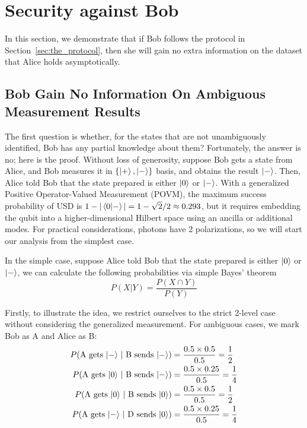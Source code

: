 \documentclass[%
 reprint,
superscriptaddress,
 amsmath,amssymb,
 aps,
]{revtex4-2}
\begin{document}
\section{Security against Bob}
\label{sec:Bob_Cheating}

In this section, we demonstrate that if Bob follows the protocol in Section~\ref{sec:the_protocol}, then she will gain no extra information on the dataset that Alice holds asymptotically.


\subsection{Bob Gain No Information On Ambiguous Measurement Results}
The first question is whether, for the states that are not unambiguously identified, Bob has any partial knowledge about them? Fortunately, the answer is no; here is the proof. Without loss of generosity, suppose Bob gets a state from Alice, and Bob measures it in $\{\ket{+}, \ket{-}\}$ basis, and obtains the result $\ket{-}$. Then, Alice told Bob that the state prepared is either $\ket{0}$ or $\ket{-}$. With a generalized Positive Operator-Valued Measurement (POVM), the maximum success probability of USD is $1-|\bra{0}\ket{-}|=1-\sqrt{2}/2\approx0.293$, but it requires embedding the qubit into a higher-dimensional Hilbert space using an ancilla or additional modes. For practical considerations, photons have 2 polarizations, so we will start our analysis from the simplest case.


In the simple case, suppose Alice told Bob that the state prepared is either $\ket{0}$ or $\ket{-}$, we can calculate the following probabilities via simple Bayes' theorem 
\begin{equation}
    P(X|Y) = \frac{P(X \cap Y)}{P(Y)}
\end{equation}

Firstly, to illustrate the idea, we restrict ourselves to the strict 2-level case without considering the generalized measurement. For ambiguous cases, we mark Bob as A and Alice as B:
\begin{equation}
    \begin{split}
        P(\text{A gets $\ket{-}$ $|$ B sends $\ket{-}$})&=\frac{0.5\times 0.5}{0.5}=\frac{1}{2}\\
        P(\text{A gets $\ket{0}$ $|$ B sends $\ket{-}$})&=\frac{0.5\times 0.25}{0.5}=\frac{1}{4}\\
        P(\text{A gets $\ket{0}$ $|$ B sends $\ket{0}$})&=\frac{0.5\times 0.5}{0.5}=\frac{1}{2}\\
        P(\text{A gets $\ket{-}$ $|$ D sends $\ket{0}$})&=\frac{0.5\times 0.25}{0.5}=\frac{1}{4}\\
    \end{split}
\end{equation}
\end{document}
